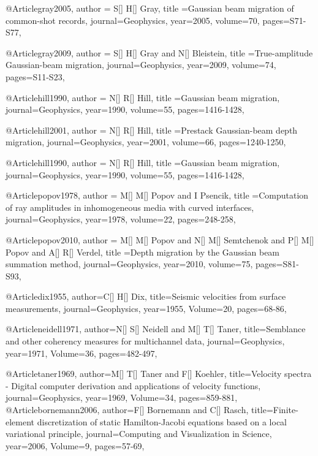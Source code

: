 {@Article{gray2005,
  author = {S[] H[] Gray},
  title ={Gaussian beam migration of common-shot records},
  journal={Geophysics},
  year=2005,
  volume=70,
  pages={S71-S77},
}

@Article{gray2009,
  author = {S[] H[] Gray and N[] Bleistein},
  title ={True-amplitude Gaussian-beam migration},
  journal={Geophysics},
  year=2009,
  volume=74,
  pages={S11-S23},
}

@Article{hill1990,
  author = {N[] R[] Hill},
  title ={Gaussian beam migration},
  journal={Geophysics},
  year=1990,
  volume=55,
  pages={1416-1428},
}

@Article{hill2001,
  author = {N[] R[] Hill},
  title ={Prestack Gaussian-beam depth migration},
  journal={Geophysics},
  year=2001,
  volume=66,
  pages={1240-1250},
}

@Article{hill1990,
  author = {N[] R[] Hill},
  title ={Gaussian beam migration},
  journal={Geophysics},
  year=1990,
  volume=55,
  pages={1416-1428},
}

@Article{popov1978,
  author = {M[] M[] Popov and I Psencik},
  title ={Computation of ray amplitudes in inhomogeneous media with curved interfaces},
  journal={Geophysics},
  year=1978,
  volume=22,
  pages={248-258},
}

@Article{popov2010,
  author = {M[] M[] Popov and N[] M[] Semtchenok and P[] M[] Popov and A[] R[] Verdel},
  title ={Depth migration by the Gaussian beam summation method},
  journal={Geophysics},
  year=2010,
  volume=75,
  pages={S81-S93},
}

@Article{dix1955,
  author={C[] H[] Dix},
  title={Seismic velocities from surface measurements},
  journal={Geophysics},
  year=1955,
  Volume=20,
  pages={68-86},
}

@Article{neidell1971,
  author={N[] S[] Neidell and M[] T[] Taner},
  title={Semblance and other coherency measures for multichannel data},
  journal={Geophysics},
  year=1971,
  Volume=36,
  pages={482-497},
}

@Article{taner1969,
  author={M[] T[] Taner and F[] Koehler},
  title={Velocity spectra - Digital computer derivation and applications of velocity functions},
  journal={Geophysics},
  year=1969,
  Volume=34,
  pages={859-881},
}
@Article{bornemann2006,
  author={F[] Bornemann and C[] Rasch},
  title={Finite-element discretization of static Hamilton-Jacobi equations based on a local variational principle},
  journal={Computing and Visualization in Science},
  year=2006,
  Volume=9,
  pages={57-69},
}

}
